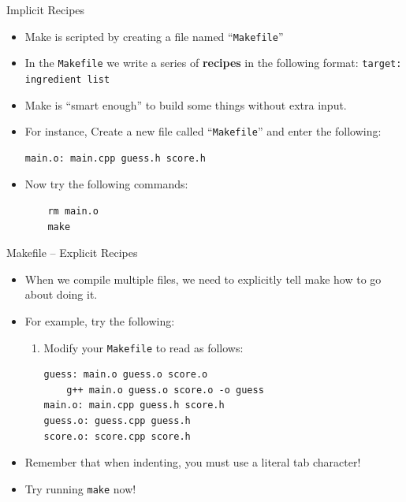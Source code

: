 \documentclass[]{beamer}
\begin{document}
\begin{frame}[fragile]{Implicit Recipes}
\begin{itemize}[<+->]
    \item Make is scripted by creating a file named ``\texttt{Makefile}''
    \item In the \texttt{Makefile} we write a series of
        \textbf{recipes} in the following format:
        \newline\texttt{target: ingredient list}
    \item Make is ``smart enough'' to build some things without extra
        input.
    \item For instance, Create a new file called ``\texttt{Makefile}''
    and enter the following:
    \newline\begin{BVerbatim}
main.o: main.cpp guess.h score.h
    \end{BVerbatim}

    \item Now try the following commands:
    \newline\begin{BVerbatim}
    rm main.o
    make
    \end{BVerbatim}
\end{itemize}
\end{frame}


\begin{frame}[fragile]{Makefile -- Explicit Recipes}
\begin{itemize}[<+->]
    \item When we compile multiple files, we need to explicitly tell
        make how to go about doing it.
    \item For example, try the following:
    \begin{enumerate}
        \item Modify your \texttt{Makefile} to read as follows:
\begin{adjustbox}{max width=\textwidth, max totalheight=0.9\textheight}
\begin{BVerbatim}
guess: main.o guess.o score.o
    g++ main.o guess.o score.o -o guess
main.o: main.cpp guess.h score.h
guess.o: guess.cpp guess.h
score.o: score.cpp score.h
\end{BVerbatim}
\end{adjustbox}
    \end{enumerate}
    \item Remember that when indenting, you must use a literal tab
        character!
    \item Try running \texttt{make} now!
\end{itemize}
\end{frame}
\end{document}

